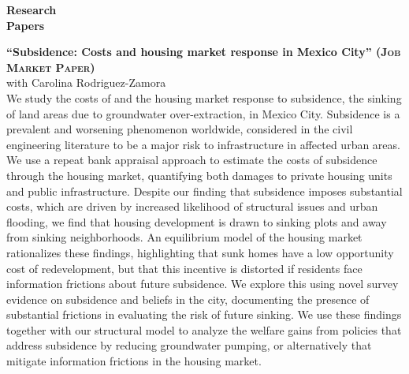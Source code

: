 \documentclass[10pt, oneside]{article}
\begin{document}
\begin{minipage}[t]{0.1\linewidth}
\textbf{Research \\ Papers}
\end{minipage}\hspace{0.05\linewidth}
\begin{minipage}[t]{0.8\linewidth}
\textbf{``Subsidence: Costs and housing market response in Mexico City'' (\textsc{Job Market Paper})}\\ 
 with Carolina Rodriguez-Zamora \\

We study the costs of and the housing market response to subsidence, the sinking of land areas due to groundwater over-extraction, in Mexico City. Subsidence is a prevalent and worsening phenomenon worldwide, considered in the civil engineering literature to be a major risk to infrastructure in affected urban areas. We use a repeat bank appraisal approach to estimate the costs of subsidence through the housing market, quantifying both damages to private housing units and public infrastructure. Despite our finding that subsidence imposes substantial costs, which are driven by increased likelihood of structural issues and urban flooding, we find that housing development is drawn to sinking plots and away from sinking neighborhoods. An equilibrium model of the housing market rationalizes these findings, highlighting that sunk homes have a low opportunity cost of redevelopment, but that this incentive is distorted if residents face information frictions about future subsidence. We explore this using novel survey evidence on subsidence and beliefs in the city, documenting the presence of substantial frictions in evaluating the risk of future sinking. We use these findings together with our structural model to analyze the welfare gains from policies that address subsidence by reducing groundwater pumping, or alternatively that mitigate information frictions in the housing market.

\end{minipage}\vspace{5mm}
\end{document}
